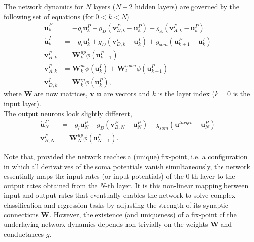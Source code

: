\documentclass[12pt,a4paper]{article}
\begin{document}
The network dynamics for $N$ layers ($N-2$ hidden layers) are governed by the following set of equations (for $0<k<N$) 
\begin{align}
\dot{\bm{u}}^P_k &= -g_l\bm{u}^P_k + g_B(\bm{v}^P_{B,k} - \bm{u}^P_k) + g_A(\bm{v}^P_{A,k} - \bm{u}^P_k)\label{eq:dyn_hidden}\\
\dot{\bm{u}}^I_k &= -g_l\bm{u}^I_k + g_D(\bm{v}^I_{D,k} - \bm{u}^I_k) + g_{som}(\bm{u}^P_{k+1} - \bm{u}^I_k)\\
\bm{v}^P_{B,k} &= \bm{W}^{up}_k\phi(\bm{u}^P_{k-1})\\
\bm{v}^P_{A,k} &= \bm{W}^{pi}_k\phi(\bm{u}^I_{k}) + \bm{W}^{down}_k\phi(\bm{u}^P_{k+1})\label{eq:apical}\\
\bm{v}^I_{D,k} &= \bm{W}^{ip}_k\phi(\bm{u}^P_{k}),
\end{align}
where $\bm{W}$ are now matrices, $\bm{v},\bm{u}$ are vectors and $k$ is the layer index ($k=0$ is the input layer).\\
The output neurons look slightly different,
\begin{align}
\dot{\bm{u}}^P_N &= -g_l\bm{u}^P_N + g_B(\bm{v}^P_{B,N} - \bm{u}^P_N) + g_{som}(\bm{u}^{target} - \bm{u}^P_N)\\
\bm{v}^P_{B,N} &= \bm{W}^{up}_N\phi(\bm{u}^P_{N-1}).\label{eq:dyn_out}
\end{align}

Note that, provided the network reaches a (unique) fix-point, i.e. a configuration in which all derivatives of the soma potentials vanish simultaneously, the network essentially maps the input rates (or input potentials) of the $0$-th layer to the output rates obtained from the $N$-th layer. It is this non-linear mapping between input and output rates that eventually enables the network to solve complex classification and regression tasks by adjusting the strength of its synaptic connections $\bm{W}$. However, the existence (and uniqueness) of a fix-point of the underlaying network dynamics depends non-trivially on the weights $\bm{W}$ and conductances $g$. 
\end{document}
